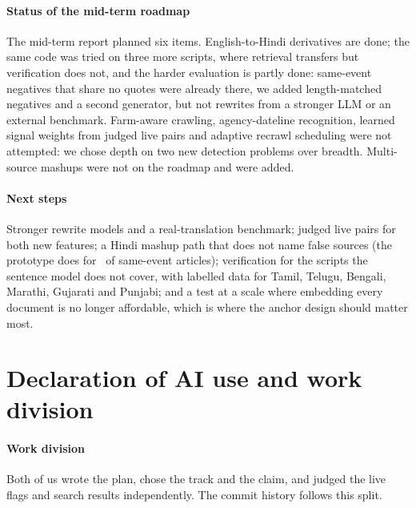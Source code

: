 \documentclass[11pt,a4paper]{article}
\begin{document}
\paragraph{Status of the mid-term roadmap} The mid-term report planned six items. English-to-Hindi derivatives are done; the same code was tried on three more scripts, where retrieval transfers but verification does not, and the harder evaluation is partly done: same-event negatives that share no quotes were already there, we added length-matched negatives and a second generator, but not rewrites from a stronger LLM or an external benchmark. Farm-aware crawling, agency-dateline recognition, learned signal weights from judged live pairs and adaptive recrawl scheduling were not attempted: we chose depth on two new detection problems over breadth. Multi-source mashups were not on the roadmap and were added.

\paragraph{Next steps} Stronger rewrite models and a real-translation benchmark; judged live pairs for both new features; a Hindi mashup path that does not name false sources (the prototype does for \nXlmFalseSame\ of same-event articles); verification for the scripts the sentence model does not cover, with labelled data for Tamil, Telugu, Bengali, Marathi, Gujarati and Punjabi; and a test at a scale where embedding every document is no longer affordable, which is where the anchor design should matter most.

\section*{Declaration of AI use and work division}

\paragraph{Work division} Both of us wrote the plan, chose the track and the claim, and judged the live flags and search results independently. The commit history follows this split.
\end{document}
